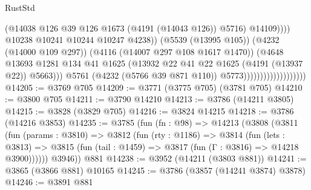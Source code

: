 \begin{lexlean}{RustStd}
\begin{coremodule}
                                                        (@14038
                                                          @126
                                                          @39
                                                          @126
                                                          @1673
                                                          (@4191 (@14043 @126))
                                                          @5716)
                                                        @14109))))
                                                @10238
                                                @10241
                                                @10244
                                                @10247
                                                @4238))
                                            (@5539 (@13995 @105))
                                            (@4232 (@14000 @109 @297))
                                            (@4116 (@14007 @297 @108 @1617 @1470))
                                            (@4648
                                              @13693
                                              @1281
                                              @134
                                              @41
                                              @1625
                                              (@13932
                                                @22
                                                @41
                                                @22
                                                @1625
                                                (@4191 (@13937 @22))
                                                @5663)))
                                          @5761
                                          (@4232 (@5766 @39 @871 @110))
                                          @5773)))))))))))))))))))
@14205 := @3769 @705
@14209 := @3771 (@3775 @705) (@3781 @705)
@14210 := @3800 @705
@14211 := @3790 @14210
@14213 := @3786 (@14211 @3805)
@14215 := @3828 (@3829 @705)
@14216 := @3824 @14215
@14218 := @3786 (@14216 @3853)
@14235 := @3785
    (fun (fn : @98) =>
    @14213
      (@3808
        (@3811
          (fun (params : @3810) =>
          @3812
            (fun (rty : @1186) =>
            @3814
              (fun (lets : @3813) =>
              @3815 (fun (tail : @1459) => @3817 (fun (Γ : @3816) => @14218 @3900))))))
        @3946))
    @881
@14238 := @3952 (@14211 (@3803 @881))
@14241 := @3865 (@3866 @881) @10165
@14245 := @3786 (@3857 (@14241 @3874) @3878)
@14246 := @3891 @881

\end{coremodule}
\end{lexlean}
